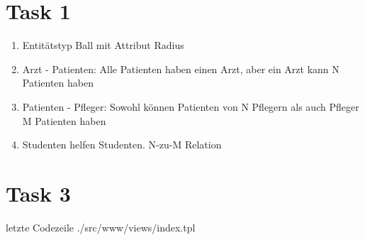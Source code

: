 
\newcommand{\dozent}{Prof. Dr. Agnès Voisard \\ Nicolas Lehmann}					%
\newcommand{\tutor}{Alexander Schulz}						%
\newcommand{\tutoriumNo}{04}				%
\newcommand{\ubungNo}{01}									%
\newcommand{\veranstaltung}{Datenbanksysteme}	%
\newcommand{\semester}{SoSe 18}						%
\newcommand{\studenten}{Eduard Beiline, Mark Niehues, Antoen Oehler}			%





\section*{Task 1}
\begin{enumerate}
\item Entitätstyp Ball mit Attribut Radius
\item Arzt - Patienten: Alle Patienten haben einen Arzt, aber ein Arzt kann N Patienten haben
\item Patienten - Pfleger: Sowohl können Patienten von N Pflegern als auch Pfleger M Patienten haben
\item Studenten helfen Studenten. N-zu-M Relation 
\end{enumerate}

\section*{Task 3}

 letzte Codezeile
{./src/www/views/index.tpl}

\printbibliography %


